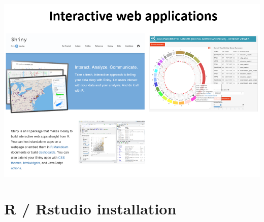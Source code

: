 \documentclass[
]{book}
\begin{document}
\includegraphics{images/01/23.PNG}

\hypertarget{r-rstudio-installation}{%
\section{R / Rstudio installation}\label{r-rstudio-installation}}
\end{document}
